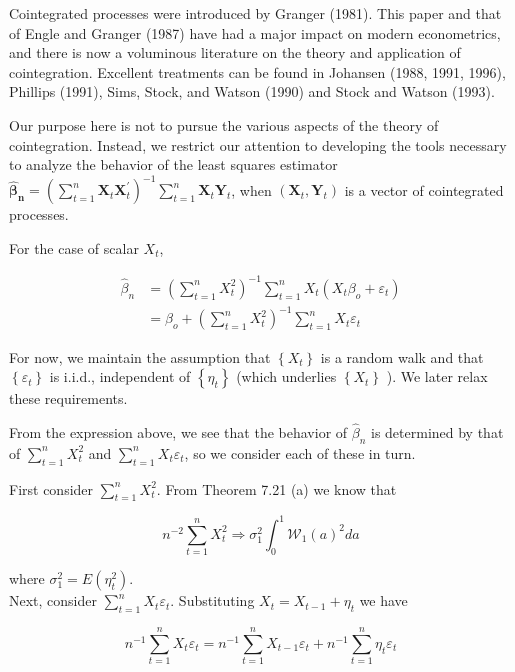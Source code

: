 \documentclass[10pt]{article}
\begin{document}
Cointegrated processes were introduced by Granger (1981). This paper and that of Engle and Granger (1987) have had a major impact on modern econometrics, and there is now a voluminous literature on the theory and application of cointegration. Excellent treatments can be found in Johansen (1988, 1991, 1996), Phillips (1991), Sims, Stock, and Watson (1990) and Stock and Watson (1993).

Our purpose here is not to pursue the various aspects of the theory of cointegration. Instead, we restrict our attention to developing the tools necessary to analyze the behavior of the least squares estimator $\hat{\boldsymbol{\beta}}_{\boldsymbol{n}}= \left(\sum_{t=1}^{n} \mathbf{X}_{t} \mathbf{X}_{t}^{\prime}\right)^{-1} \sum_{t=1}^{n} \mathbf{X}_{t} \mathbf{Y}_{t}$, when $\left(\mathbf{X}_{t}, \mathbf{Y}_{t}\right)$ is a vector of cointegrated processes.

For the case of scalar $X_{t}$,

$$
\begin{aligned}
\hat{\beta}_{n} & =\left(\sum_{t=1}^{n} X_{t}^{2}\right)^{-1} \sum_{t=1}^{n} X_{t}\left(X_{t} \beta_{o}+\varepsilon_{t}\right) \\
& =\beta_{o}+\left(\sum_{t=1}^{n} X_{t}^{2}\right)^{-1} \sum_{t=1}^{n} X_{t} \varepsilon_{t}
\end{aligned}
$$

For now, we maintain the assumption that $\left\{X_{t}\right\}$ is a random walk and that $\left\{\varepsilon_{t}\right\}$ is i.i.d., independent of $\left\{\eta_{t}\right\}$ (which underlies $\left\{X_{t}\right\}$ ). We later relax these requirements.

From the expression above, we see that the behavior of $\hat{\beta}_{n}$ is determined by that of $\sum_{t=1}^{n} X_{t}^{2}$ and $\sum_{t=1}^{n} X_{t} \varepsilon_{t}$, so we consider each of these in turn.

First consider $\sum_{t=1}^{n} X_{t}^{2}$. From Theorem 7.21 (a) we know that

$$
n^{-2} \sum_{t=1}^{n} X_{t}^{2} \Rightarrow \sigma_{1}^{2} \int_{0}^{1} \mathcal{W}_{1}(a)^{2} d a
$$

where $\sigma_{1}^{2}=E\left(\eta_{t}^{2}\right)$.\\
Next, consider $\sum_{t=1}^{n} X_{t} \varepsilon_{t}$. Substituting $X_{t}=X_{t-1}+\eta_{t}$ we have

$$
n^{-1} \sum_{t=1}^{n} X_{t} \varepsilon_{t}=n^{-1} \sum_{t=1}^{n} X_{t-1} \varepsilon_{t}+n^{-1} \sum_{t=1}^{n} \eta_{t} \varepsilon_{t}
$$
\end{document}
